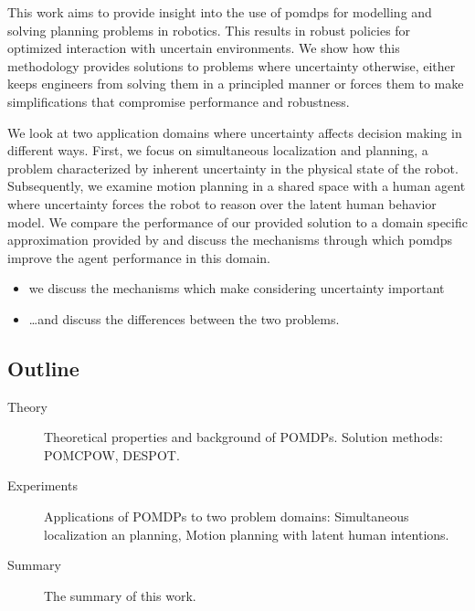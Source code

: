 This work aims to provide insight into the use of \acp{pomdp} for modelling and
solving planning problems in robotics. This results in robust policies for
optimized interaction with uncertain environments. We show how this methodology
provides solutions to problems where uncertainty otherwise, either keeps
engineers from solving them in a principled manner or forces them to make
simplifications that compromise performance and robustness.


We look at two application domains where uncertainty affects decision making
in different ways. First, we focus on simultaneous localization and
planning, a problem characterized by inherent uncertainty in the physical state
of the robot. Subsequently, we examine motion planning in a shared space with a human agent
where uncertainty forces the robot to reason over the latent human behavior
model. We compare the performance of our provided solution to a domain specific
approximation provided by \cite{fisac2018probabilistically} and discuss the mechanisms
through which \acp{pomdp} improve the agent performance in this domain.

\begin{itemize}
  \item we discuss the mechanisms which make considering uncertainty important
  \item \dots and discuss the differences between the two problems.
\end{itemize}

\subsection*{Outline}

\begin{description}
  \item[Theory] Theoretical properties and background of POMDPs. Solution methods: POMCPOW, DESPOT.
  \item[Experiments] Applications of POMDPs to two problem domains: Simultaneous localization an planning, Motion planning with latent human intentions.
  \item[Summary] The summary of this work.
\end{description}
